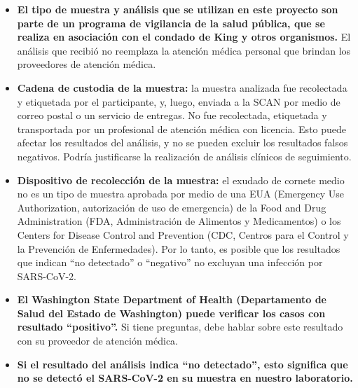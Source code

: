 \documentclass[10pt]{article}
\begin{document}
\begin{itemize}
\item

  \textbf{El tipo de muestra y análisis que se utilizan en este proyecto son
  parte de un programa de vigilancia de la salud pública, que se realiza en
  asociación con el condado de King y otros organismos.} El análisis que recibió
  no reemplaza la atención médica personal que brindan los proveedores de
  atención médica.

\item

  \textbf{Cadena de custodia de la muestra:} la muestra analizada fue
  recolectada y etiquetada por el participante, y, luego, enviada a la SCAN por
  medio de correo postal o un servicio de entregas. No fue recolectada,
  etiquetada y transportada por un profesional de atención médica con licencia.
  Esto puede afectar los resultados del análisis, y no se pueden excluir los
  resultados falsos negativos. Podría justificarse la realización de análisis
  clínicos de seguimiento.

\item

  \textbf{Dispositivo de recolección de la muestra:} el exudado de cornete medio
  no es un tipo de muestra aprobada por medio de una EUA (Emergency Use
  Authorization, autorización de uso de emergencia) de la Food and Drug
  Administration (FDA, Administración de Alimentos y Medicamentos) o los Centers
  for Disease Control and Prevention (CDC, Centros para el Control y la
  Prevención de Enfermedades​). Por lo tanto, es posible que los resultados que
  indican “no detectado” o “negativo” no excluyan una infección por SARS-CoV-2.

\item

  \textbf{El Washington State Department of Health (Departamento de Salud del
  Estado de Washington) puede verificar los casos con resultado ``positivo''.}
  Si tiene preguntas, debe hablar sobre este resultado con su proveedor de
  atención médica.

\item{
  \textbf{Si el resultado del análisis indica ``no detectado'', esto significa
  que no se detectó el SARS-CoV-2 en su muestra en nuestro laboratorio.}

}
\end{itemize}
\end{document}
